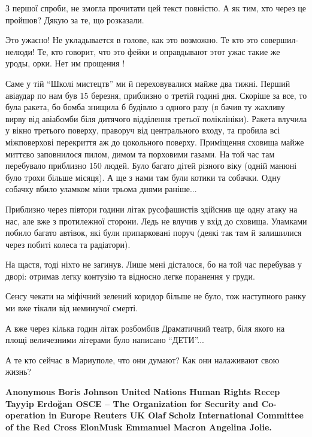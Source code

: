\begin{itemize}

З першої спроби, не змогла прочитати цей текст повністю. А як тим, хто через це
пройшов? Дякую за те, що розказали.


Это ужасно! Не укладывается в голове, как это возможно. Те кто это совершил-
нелюди! Те, кто говорит, что это фейки и оправдывают этот ужас такие же уроды,
орки. Нет им прощения !


Саме у тій \enquote{Школі мистецтв} ми й переховувалися майже два тижні. Перший
авіаудар по нам був 15 березня, приблизно о третій годині дня. Скоріше за все,
то була ракета, бо бомба знищила б будівлю з одного разу (я бачив ту жахливу
вирву від авіабомби біля дитячого відділення третьої поліклініки). Ракета
влучила у вікно третього поверху, праворуч від центрального входу, та пробила
всі міжповерхові перекриття аж до цокольного поверху. Приміщення сховища майже
миттєво заповнилося пилом, димом та порховими газами. На той час там перебувало
приблизно 150 людей. Було багато дітей різного віку (одній манюні було трохи
більше місяця). А ще з нами там були котики та собачки. Одну собачку вбило
уламком міни трьома днями раніше...

Приблизно через півтори години літак русофашистів здійснив ще одну атаку на
нас, але вже з протилежної сторони. Ледь не влучив у вхід до сховища. Уламками
побило багато автівок, які були припарковані поруч (деякі так там й залишилися
через побиті колеса та радіатори).

На щастя, тоді ніхто не загинув. Лише мені дісталося, бо на той час перебував у
дворі: отримав легку контузію та відносно легке поранення у груди.

Сенсу чекати на міфічний зелений коридор більше не було, тож наступного ранку
ми вже тікали від неминучої смерті.

А вже через кілька годин літак розбомбив Драматичний театр, біля якого на площі
величезними літерами було написано \enquote{ДЕТИ}...


А те кто сейчас в Мариуполе, что они думают? Как они налаживают свою жизнь?


\begingroup
\bfseries
\obeycr
Anonymous
Boris Johnson
United Nations Human Rights
Recep Tayyip Erdoğan
OSCE – The Organization for Security and Co-operation in Europe
Reuters UK
Olaf Scholz
International Committee of the Red Cross
ElonMusk
Emmanuel Macron
Angelina Jolie.
\restorecr
\endgroup


\end{itemize}

